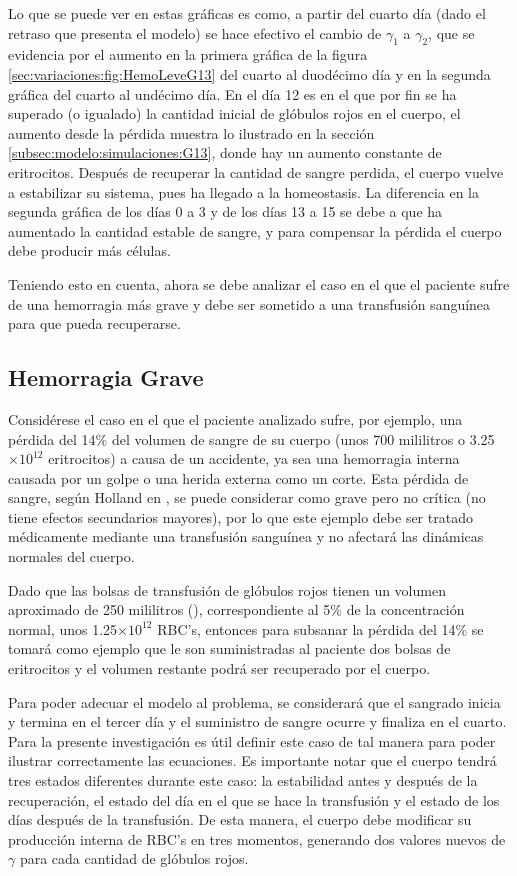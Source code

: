 Lo que se puede ver en estas gráficas es como, a partir del cuarto día (dado el retraso que presenta el modelo) se hace efectivo el cambio de $\gamma_1$ a $\gamma_2$, que se evidencia por el aumento en la primera gráfica de la figura \ref{sec:variaciones:fig:HemoLeveG13} del cuarto al duodécimo día y en la segunda gráfica del cuarto al undécimo día. En el día 12 es en el que por fin se ha superado (o igualado) la cantidad inicial de glóbulos rojos en el cuerpo, el aumento desde la pérdida muestra lo ilustrado en la sección \ref{subsec:modelo:simulaciones:G13}, donde hay un aumento constante de eritrocitos. Después de recuperar la cantidad de sangre perdida, el cuerpo vuelve a estabilizar su sistema, pues ha llegado a la homeostasis. La diferencia en la segunda gráfica de los días 0 a 3 y de los días 13 a 15 se debe a que ha aumentado la cantidad estable de sangre, y para compensar la pérdida el cuerpo debe producir más células.

Teniendo esto en cuenta, ahora se debe analizar el caso en el que el paciente sufre de una hemorragia más grave y debe ser sometido a una transfusión sanguínea para que pueda recuperarse.

\subsection{Hemorragia Grave}

Considérese el caso en el que el paciente analizado sufre, por ejemplo, una pérdida del 14$\%$ del volumen de sangre de su cuerpo (unos 700 mililitros o 3.25$\times 10^{12}$ eritrocitos) a causa de un accidente, ya sea una hemorragia interna causada por un golpe o una herida externa como un corte. Esta pérdida de sangre, según Holland en \cite{PerdidaSangre}, se puede considerar como grave pero no crítica (no tiene efectos secundarios mayores), por lo que este ejemplo debe ser tratado médicamente mediante una transfusión sanguínea y no afectará las dinámicas normales del cuerpo.

Dado que las bolsas de transfusión de glóbulos rojos tienen un volumen aproximado de 250 mililitros (\cite{Granada}), correspondiente al 5$\%$ de la concentración normal, unos 1.25$\times 10^{12}$ RBC's, entonces para subsanar la pérdida del 14$\%$ se tomará como ejemplo que le son suministradas al paciente dos bolsas de eritrocitos y el volumen restante podrá ser recuperado por el cuerpo.

Para poder adecuar el modelo al problema, se considerará que el sangrado inicia y termina en el tercer día y el suministro de sangre ocurre y finaliza en el cuarto. Para la presente investigación es útil definir este caso de tal manera para poder ilustrar correctamente las ecuaciones. Es importante notar que el cuerpo tendrá tres estados diferentes durante este caso: la estabilidad antes y después de la recuperación, el estado del día en el que se hace la transfusión y el estado de los días después de la transfusión. De esta manera, el cuerpo debe modificar su producción interna de RBC's en tres momentos, generando dos valores nuevos de $\gamma$ para cada cantidad de glóbulos rojos.


